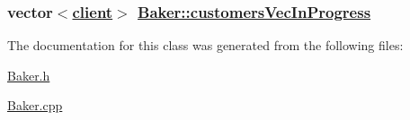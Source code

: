 \hypertarget{class_baker_0b7dacb9817ff529ee046a5c369051fa}{
\subsubsection[customersVecInProgress]{\setlength{\rightskip}{0pt plus 5cm}vector$<$\hyperlink{classclient}{client}$>$ \hyperlink{class_baker_0b7dacb9817ff529ee046a5c369051fa}{Baker::customers\-Vec\-In\-Progress}}}
\label{class_baker_0b7dacb9817ff529ee046a5c369051fa}




The documentation for this class was generated from the following files:\begin{CompactItemize}
\item 
\hyperlink{_baker_8h}{Baker.h}\item 
\hyperlink{_baker_8cpp}{Baker.cpp}\end{CompactItemize}
